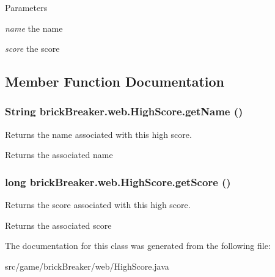 \begin{DoxyParams}{Parameters}
\item[{\em name}]the name \item[{\em score}]the score \end{DoxyParams}


\subsection{Member Function Documentation}
\hypertarget{classbrick_breaker_1_1web_1_1_high_score_afc959404f76813aeb079bf435bb6a52d}{
\subsubsection[{getName}]{\setlength{\rightskip}{0pt plus 5cm}String brickBreaker.web.HighScore.getName ()}}
\label{classbrick_breaker_1_1web_1_1_high_score_afc959404f76813aeb079bf435bb6a52d}
Returns the name associated with this high score.

\begin{DoxyReturn}{Returns}
the associated name 
\end{DoxyReturn}
\hypertarget{classbrick_breaker_1_1web_1_1_high_score_a8f8c2b28d7975e261286f5dfb6d62752}{
\subsubsection[{getScore}]{\setlength{\rightskip}{0pt plus 5cm}long brickBreaker.web.HighScore.getScore ()}}
\label{classbrick_breaker_1_1web_1_1_high_score_a8f8c2b28d7975e261286f5dfb6d62752}
Returns the score associated with this high score.

\begin{DoxyReturn}{Returns}
the associated score 
\end{DoxyReturn}


The documentation for this class was generated from the following file:\begin{DoxyCompactItemize}
\item 
src/game/brickBreaker/web/HighScore.java\end{DoxyCompactItemize}
